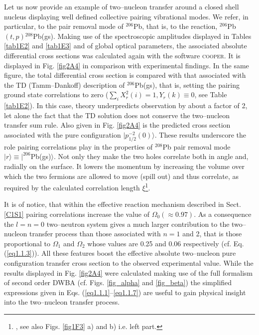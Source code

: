 Let us now provide an example of two--nucleon transfer around a closed shell nucleus displaying well defined collective pairing vibrational modes. We refer, in particular, to the pair removal mode of $^{206}$Pb, that is, to the reaction, $^{206}$Pb$(t,p)$$^{208}$Pb(gs). Making use of the spectroscopic amplitudes displayed in Tables \ref{tab1E2} and \ref{tab1E3} and of global optical parameters, the associated  absolute differential cross sections was calculated again with the software \textsc{cooper}. It is displayed in Fig. \ref{fig2A4} in comparison with experimental findings. In  the same figure, the total differential cross section is compared with that associated with the TD (Tamm--Dankoff) description of $^{206}$Pb(gs), that is, setting the pairing ground state correlations to zero ($\sum_i X^2_r(i)=1, Y_r(k)\equiv 0$, see Table \ref{tab1E2}). In this case, theory underpredicts observation by about a factor of 2, let alone the fact that the TD solution does not conserve the two--nucleon transfer sum rule. Also given in Fig. \ref{fig2A4} is the predicted cross section associated with the pure configuration $|p_{1/2}^{-2}(0)\rangle$. These results underscore the role pairing  correlations play in the properties of $^{208}$Pb pair removal mode $|r\rangle \equiv |^{206}$Pb(gs)$\rangle$. Not only they make the two holes correlate both in angle and, radially on the surface. It lowers the momentum by increasing the volume over which the two fermions are allowed to move (spill out) and thus correlate, as required  by the calculated correlation length $\xi$\footnote{\cite{Bertsch:67}, \cite{Ferreira:84,Matsuo:13} see also Figs. \ref{fig1F3} a) and b) i.e. left part.}. 


It is of notice, that within the effective reaction mechanism described in Sect. \ref{C1S1} pairing correlations increase the value of $\Omega_0(\approx 0.97)$. As a consequence the   $l=n=0$ two--neutron system gives a much larger contribution to the two--nucleon transfer process than those associated with $n=1$ and 2, that is those proportional to $\Omega_1$ and $\Omega_2$ whose values are 0.25 and 0.06 respectively (cf. Eq. (\ref{eq1.1.3})). All these features boost the effective absolute two--nucleon pure configuration transfer cross section to the observed experimental value. While the results displayed in Fig. \ref{fig2A4} were calculated making use of the full formalism of second order DWBA (cf. Figs. \ref{fig_alpha} and \ref{fig_beta}) the simplified expressions given in Eqs. (\ref{eq1.1.1}--\ref{eq1.1.7}) are useful to gain physical insight into the two--nucleon transfer process.








